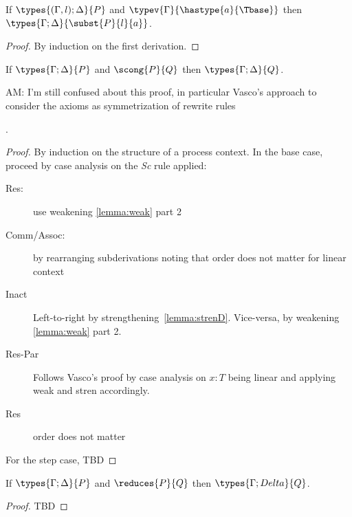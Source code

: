 \begin{lemma}[Substitution]\mbox{}
  If $\types{(\Gamma, l);\Delta}{P}$ and ${\typev{\Gamma}{\hastype{a}{\Tbase}}}$ then
  \( \types{\Gamma;\Delta}{\subst{P}{l}{a}} \).
\end{lemma}
\begin{proof}
  By induction on the first derivation.
\end{proof}
\begin{lemma}
  If \( \types{\Gamma;\Delta}{P} \) and \( \scong{P}{Q} \) then \( \types{\Gamma;\Delta}{Q} \).
\end{lemma}
\begin{metanote}
  AM: I'm still confused about this proof, in particular Vasco's approach to consider the axioms as symmetrization of rewrite rules
\end{metanote}.
\begin{proof}
  By induction on the structure of a process context. In the base case, proceed by case analysis on the \textsl{Sc} rule applied:
  \begin{description}
  \item[Res:] use weakening \ref{lemma:weak} part 2
  \item[Comm/Assoc:] by rearranging subderivations noting that  order does not matter for linear context
  \item[Inact] Left-to-right by strengthening~\ref{lemma:strenD}. Vice-versa, by weakening \ref{lemma:weak} part 2.
  \item[Res-Par] Follows Vasco's proof by case analysis on $x : T$ being linear and applying weak and stren accordingly.
  \item[Res] order does not matter
  \end{description}
  For the step case, TBD
\end{proof}
\begin{theorem}
  If \( \types{\Gamma;\Delta}{P} \) and \( \reduces{P}{Q} \) then \( \types{\Gamma;Delta}{Q} \).
\end{theorem}
\begin{proof}
  TBD
\end{proof}


